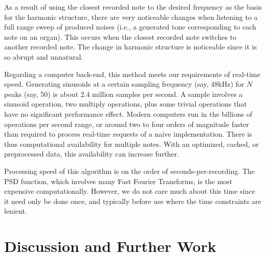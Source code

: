 \documentclass{article}
\begin{document}
As a result of using the closest recorded note to the desired frequency as the basis for the harmonic structure, there are very noticeable changes when listening to a full range sweep of produced noises (i.e., a generated tone corresponding to each note on an organ). This occurs when the closest recorded note switches to another recorded note. The change in harmonic structure is noticeable since it is so abrupt and unnatural.

Regarding a computer back-end, this method meets our requirements of real-time speed. Generating sinusoids at a certain sampling frequency (say, 48kHz) for $N$ peaks (say, 50) is about 2.4 million samples per second. A sample involves a sinusoid operation, two multiply operations, plus some trivial operations that have no significant performance effect. Modern computers run in the billions of operations per second range, or around two to four orders of magnitude faster than required to process real-time requests of a naive implementation. There is thus computational availability for multiple notes. With an optimized, cached, or preprocessed data, this availability can increase further.

Processing speed of this algorithm is on the order of seconds-per-recording. The PSD function, which involves many Fast Fourier Transforms, is the most expensive computationally. However, we do not care much about this time since it need only be done once, and typically before use where the time constraints are lenient.

\section{Discussion and Further Work}
\end{document}
